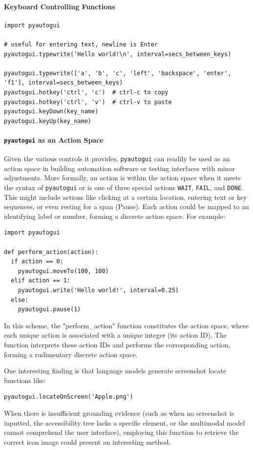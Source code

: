 \paragraph{Keyboard Controlling Functions}

\small
\begin{Verbatim}
import pyautogui

# useful for entering text, newline is Enter
pyautogui.typewrite('Hello world!\n', interval=secs_between_keys)

pyautogui.typewrite(['a', 'b', 'c', 'left', 'backspace', 'enter', 'f1'], interval=secs_between_keys)
pyautogui.hotkey('ctrl', 'c')  # ctrl-c to copy
pyautogui.hotkey('ctrl', 'v')  # ctrl-v to paste
pyautogui.keyDown(key_name)
pyautogui.keyUp(key_name)
\end{Verbatim}

\paragraph{\texttt{pyautogui} as an Action Space}

Given the various controls it provides, \texttt{pyautogui} can readily be used as an action space in building automation software or testing interfaces with minor adjustments.
More formally, an action is within the action space when it meets the syntax of \texttt{pyautogui} or is one of three special actions \texttt{WAIT}, \texttt{FAIL}, and \texttt{DONE}.
This might include actions like clicking at a certain location, entering text or key sequences, or even resting for a span (Pause). Each action could be mapped to an identifying label or number, forming a discrete action space. 
For example:
\small
\begin{Verbatim}
import pyautogui

def perform_action(action):
  if action == 0:
    pyautogui.moveTo(100, 100)
  elif action == 1:
    pyautogui.write('Hello world!', interval=0.25)
  else:
    pyautogui.pause(1)
\end{Verbatim}
In this scheme, the "perform\_action" function constitutes the action space, where each unique action is associated with a unique integer (its action ID). 
The function interprets these action IDs and performs the corresponding action, forming a rudimentary discrete action space.

One interesting finding is that language models generate screenshot locate functions like:
\begin{Verbatim}
pyautogui.locateOnScreen('Apple.png')
\end{Verbatim}
When there is insufficient grounding evidence (such as when no screenshot is inputted, the accessibility tree lacks a specific element, or the multimodal model cannot comprehend the user interface), employing this function to retrieve the correct icon image could present an interesting method.

